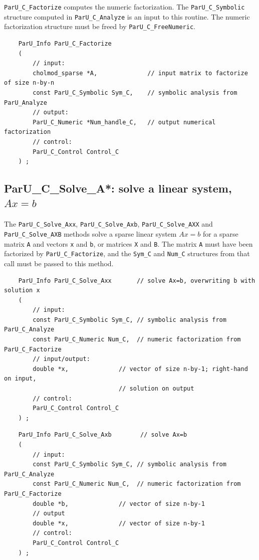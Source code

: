 \documentclass[12pt]{article}
\begin{document}
    \verb'ParU_C_Factorize' computes the numeric factorization.  The
    \verb'ParU_C_Symbolic' structure computed in \verb'ParU_C_Analyze' is an
    input to this routine.  The numeric factorization structure must be freed
    by \verb'ParU_C_FreeNumeric'.

    {\footnotesize
    \begin{verbatim}
    ParU_Info ParU_C_Factorize
    (
        // input:
        cholmod_sparse *A,              // input matrix to factorize of size n-by-n
        const ParU_C_Symbolic Sym_C,    // symbolic analysis from ParU_Analyze
        // output:
        ParU_C_Numeric *Num_handle_C,   // output numerical factorization
        // control:
        ParU_C_Control Control_C
    ) ; \end{verbatim} }

\subsection{{\sf ParU\_C\_Solve\_A*}: solve a linear system, $Ax=b$}

    The \verb'ParU_C_Solve_Axx',  \verb'ParU_C_Solve_Axb',
    \verb'ParU_C_Solve_AXX' and \verb'ParU_C_Solve_AXB' methods solve a sparse
    linear system $Ax=b$ for a sparse matrix \verb'A' and vectors \verb'x' and
    \verb'b', or matrices \verb'X' and \verb'B'.  The matrix \verb'A' must have
    been factorized by \verb'ParU_C_Factorize', and the \verb'Sym_C' and
    \verb'Num_C' structures from that call must be passed to this method.

    {\footnotesize
    \begin{verbatim}
    ParU_Info ParU_C_Solve_Axx       // solve Ax=b, overwriting b with solution x
    (
        // input:
        const ParU_C_Symbolic Sym_C, // symbolic analysis from ParU_C_Analyze
        const ParU_C_Numeric Num_C,  // numeric factorization from ParU_C_Factorize
        // input/output:
        double *x,              // vector of size n-by-1; right-hand on input,
                                // solution on output
        // control:
        ParU_C_Control Control_C
    ) ; \end{verbatim} }

    {\footnotesize
    \begin{verbatim}
    ParU_Info ParU_C_Solve_Axb        // solve Ax=b
    (
        // input:
        const ParU_C_Symbolic Sym_C, // symbolic analysis from ParU_C_Analyze
        const ParU_C_Numeric Num_C,  // numeric factorization from ParU_C_Factorize
        double *b,              // vector of size n-by-1
        // output
        double *x,              // vector of size n-by-1
        // control:
        ParU_C_Control Control_C
    ) ; \end{verbatim} }
\end{document}
